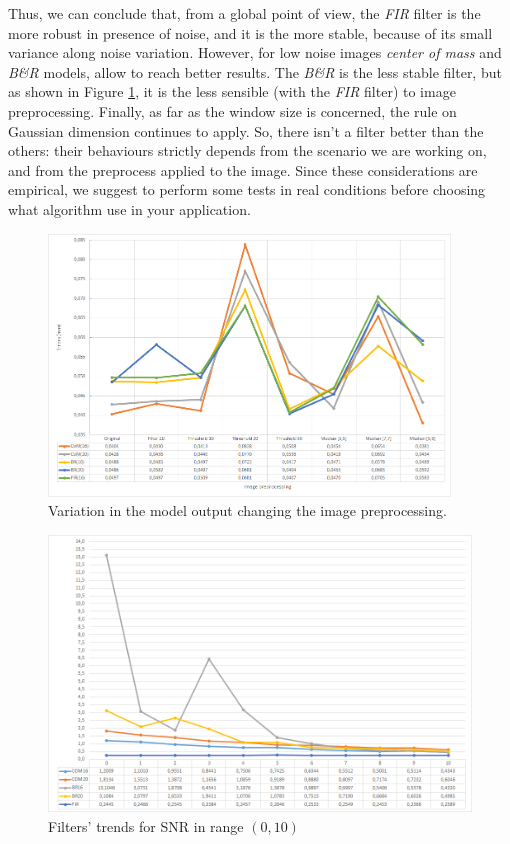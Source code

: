Thus, we can conclude that, from a global point of view, the \textit{FIR} filter is the more robust in presence of noise, and it is the more stable, because of its small variance along noise variation. However, for low noise images \textit{center of mass} and \textit{B\&R} models, allow to reach better results. The \textit{B\&R} is the less stable filter, but as shown in Figure \ref{fig:prep-dima}, it is the less sensible (with the \textit{FIR} filter) to image preprocessing. Finally, as far as the window size is concerned, the rule on Gaussian dimension continues to apply. So, there isn't a filter better than the others: their behaviours strictly depends from the scenario we are working on, and from the preprocess applied to the image. Since these considerations are empirical, we suggest to perform some tests in real conditions before choosing what algorithm use in your application.
  \begin{figure}[b!]
    \centering
    \includegraphics[width=0.95\textwidth]{./images/analysis/noise/preprocessing_dima.png}
    \caption{Variation in the model output changing the image preprocessing.}
    \label{fig:prep-dima}
  \end{figure}
\vfill
  \begin{figure}
    \centering
    \includegraphics[width=\textwidth]{./images/analysis/noise/prep1.png}
    \caption{Filters' trends for \acs{SNR} in range $\left( 0, 10 \right)$}
    \label{fig:prep1}
  \end{figure}
